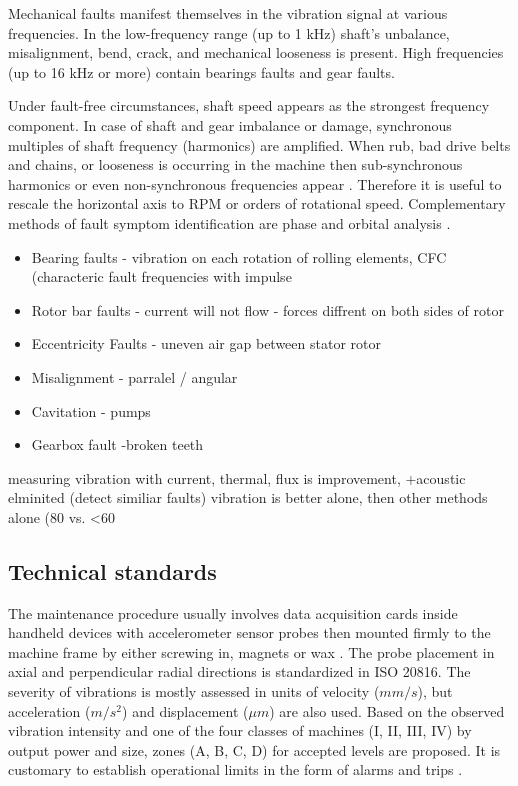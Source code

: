 Mechanical faults manifest themselves in the vibration signal at various frequencies. In the low-frequency range (up to 1 kHz) shaft's unbalance, misalignment, bend, crack, and mechanical looseness is present. High frequencies (up to 16 kHz or more) contain bearings faults and gear faults.

Under fault-free circumstances, shaft speed appears as the strongest frequency component. In case of shaft and gear imbalance or damage, synchronous multiples of shaft frequency (harmonics) are amplified. When rub, bad drive belts and chains, or looseness is occurring in the machine then sub-synchronous harmonics or even non-synchronous frequencies appear \cite{mohanty_machinery_2015}.  Therefore it is useful to rescale the horizontal axis to RPM or orders of rotational speed. Complementary methods of fault symptom identification are phase and orbital analysis \cite{scheffer_practical_2004}.

\begin{itemize}
\item Bearing faults - vibration on each rotation of rolling elements, CFC (characteric fault frequencies with impulse
\item Rotor bar faults - current will not flow - forces diffrent on both sides of rotor
\item Eccentricity Faults - uneven air gap between stator rotor
\item Misalignment - parralel / angular
\item Cavitation - pumps
\item Gearbox fault -broken teeth
\end{itemize}
measuring vibration with current, thermal, flux is improvement, +acoustic elminited (detect similiar faults)
vibration is better alone, then other methods alone (80 vs. <60%
 \cite{goel_methodology_2022}

\subsection{Technical standards}
The maintenance procedure usually involves data acquisition cards inside handheld devices with accelerometer sensor probes then mounted firmly to the machine frame by either screwing in, magnets or wax \cite{ziaran_technicka_2013}. The probe placement in axial and perpendicular radial directions is standardized in ISO 20816. The severity of vibrations is mostly assessed in units of velocity ($mm/s$), but acceleration ($m/s^2$) and displacement ($\mu m$) are also used. Based on the observed vibration intensity and one of the four classes of machines (I, II, III, IV) by output power and size, zones (A, B, C, D) for accepted levels are proposed. It is customary to establish operational limits in the form of alarms and trips \cite{iso_20816}.

